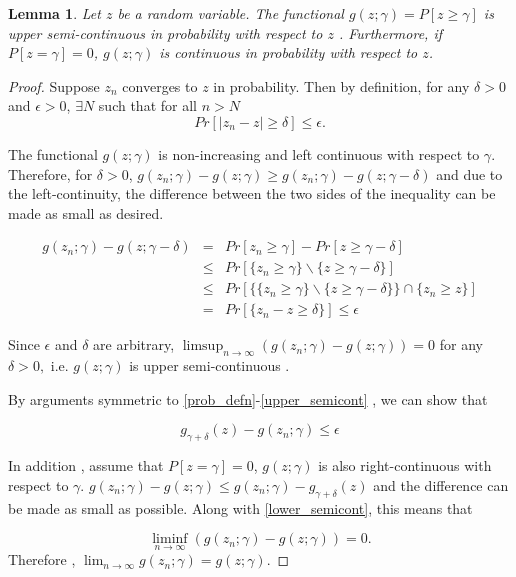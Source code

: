 \documentclass[12pt]{article} %
\newtheorem{lem}{Lemma}
\begin{document}
\begin{lem}
Let $z$ be a random variable. The functional $g(z;\gamma) = P\left[z \geq \gamma \right]$ is upper semi-continuous in probability with respect to $z$ . Furthermore, if $P\left[z = \gamma \right]=0$, $g(z;\gamma)$ is continuous in probability with respect to $z$. \label{lemma_1}
\end{lem}
\begin{proof}
Suppose $z_n$ converges to $z$ in probability. Then by definition, for any  $\delta>0$ and  $\epsilon>0$, $\exists	N$ such that for all   $n>N$ 
$$ Pr\left[\left|z_n-z\right| \geq \delta \right] \leq \epsilon.$$

 The functional  $g(z;\gamma)$ is  non-increasing and left continuous with respect to $\gamma$. Therefore, for $\delta>0$, 
$g(z_n;\gamma) -g(z;\gamma) \geq g(z_n;\gamma) -g(z;\gamma-\delta) $ and due to the left-continuity, the difference between the two sides of the inequality can be made as small as desired.

\begin{eqnarray}
g(z_n;\gamma) - g(z;\gamma-\delta) & = &Pr\left[z_n\geq \gamma \right] -Pr\left[z \geq  \gamma - \delta \right] \label{prob_defn}\\
& \leq &  Pr\left[\{z_n \geq \gamma \} \backslash \{z \geq \gamma - \delta \} \right] \label{set_diff}\\
& \leq & Pr\left[\{\{z_n \geq \gamma \} \backslash \{z \geq \gamma - \delta \} \} \cap \{z_n \geq  z\} \right] \label{conjunct_with_set} \\
& =  & Pr\left[\{z_n - z \geq \delta \} \right] \leq \epsilon \label{upper_semicont}
\end{eqnarray}
 
Since $\epsilon$ and $\delta$ are arbitrary,
 $ \limsup_{n \rightarrow \infty} ( {g(z_n;\gamma)}- g(z;\gamma) ) =  0$ for any $\delta>0, $ i.e. $g(z;\gamma)$ is upper semi-continuous .

By arguments  symmetric to  \eqref{prob_defn}-\eqref{upper_semicont} , we can show that

\begin{equation}
g_{\gamma+\delta}(z) - g(z_n;\gamma) \leq \epsilon \label{lower_semicont}
\end{equation}


In addition , assume that  $P\left[z = \gamma \right]=0$, $g(z;\gamma)$ is also right-continuous with respect to $\gamma$.
$g(z_n;\gamma) -g(z;\gamma) \leq g(z_n;\gamma) -g_{\gamma+\delta}(z)$ and the difference can be made as small as possible. Along with \ref{lower_semicont}, this means that

 $$\liminf_{n \rightarrow \infty} ( {g(z_n;\gamma)}- g(z;\gamma) ) = 0.$$ Therefore , $\lim_{n\rightarrow \infty}g(z_n;\gamma) = g(z;\gamma)$.
\end{proof}
\end{document}
